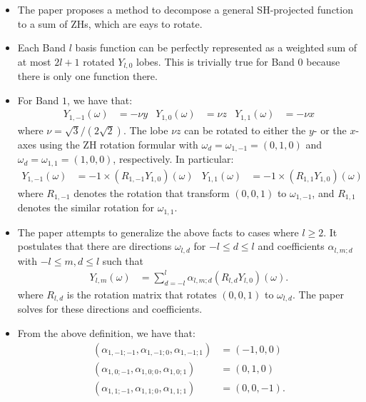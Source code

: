 \documentclass[10pt]{article}
\begin{document}
    \begin{itemize}
        \item The paper \cite{Nowrouzezahrai:2012} proposes a method to decompose a general SH-projected function to a sum of ZHs, which are eays to rotate.

        \item Each Band $l$ basis function can be perfectly represented as a weighted sum of at most $2l+1$ rotated $Y_{l,0}$ lobes.  This is trivially true for Band $0$ because there is only one function there.

        \item For Band $1$, we have that:
        \begin{align*}
            Y_{1,-1}(\omega) &= -\nu y &
            Y_{1,0}(\omega) &= \nu z &
            Y_{1,1}(\omega) &= -\nu x
        \end{align*}
        where $\nu = \sqrt{3}/(2\sqrt{2})$.  The lobe $\nu z$ can be rotated to either the $y$- or the $x$-axes using the ZH rotation formular with $\omega_d = \omega_{1,-1} = (0,1,0)$  and $\omega_d = \omega_{1,1} = (1,0,0)$, respectively.  In particular:
        \begin{align*}
            Y_{1,-1}(\omega) &= -1 \times (R_{1,-1}Y_{1,0})(\omega) &
            Y_{1,1}(\omega) &= -1 \times (R_{1,1} Y_{1,0})(\omega)
        \end{align*}
        where $R_{1,-1}$ denotes the rotation that transform $(0,0,1)$ to $\omega_{1,-1}$, and $R_{1,1}$ denotes the similar rotation for $\omega_{1,1}$.

        \item The paper attempts to generalize the above facts to cases where $l \geq 2$.  It postulates that there are directions $\omega_{l,d}$ for $-l \leq d \leq l$ and coefficients $\alpha_{l,m;d}$ with $-l\leq m,d \leq l$ such that
        \begin{align}
            Y_{l,m}(\omega) &= \sum_{d=-l}^l \alpha_{l,m;d} (R_{l,d}Y_{l,0}) (\omega). \label{zh-decomposition}
        \end{align}
        where $R_{l,d}$ is the rotation matrix that rotates $(0,0,1)$ to $\omega_{l,d}$.  The paper solves for these directions and coefficients.
        
        \item From the above definition, we have that:
        \begin{align*}
            (\alpha_{1,-1;-1}, \alpha_{1,-1;0}, \alpha_{1,-1;1}) &= (-1, 0, 0) \\
            (\alpha_{1,0;-1}, \alpha_{1,0;0}, \alpha_{1,0;1}) &= (0, 1, 0) \\
            (\alpha_{1,1;-1}, \alpha_{1,1;0}, \alpha_{1,1;1}) &= (0, 0, -1).
        \end{align*}
        

\end{itemize}
\end{document}
